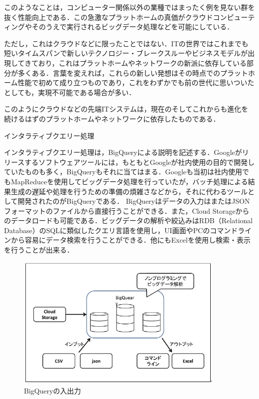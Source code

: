 このようなことは，コンピューター関係以外の業種ではまったく例を見ない群を抜く性能向上である．この急激なプラットホームの真価がクラウドコンピューティングやそのうえで実行されるビッグデータ処理などを可能にしている．\cite{bigquerystart}

ただし，これはクラウドなどに限ったことではない．ITの世界ではこれまでも短いタイムスパンで新しいテクノロジー・ブレークスルーやビジネスモデルが出現してきており，これはプラットホームやネットワークの新派に依存している部分が多くある．言葉を変えれば，これらの新しい発想はその時点でのプラットホーム性能で初めて成り立つものであり，これをわずかでも前の世代に思いついたとしても，実現不可能である場合が多い．

このようにクラウドなどの先端ITシステムは，現在のそしてこれからも進化を続けるはずのプラットホームやネットワークに依存したものである．\cite{bigquerystart}


インタラティブクエリー処理

インタラティブクエリー処理は，BigQueryによる説明を記述する．Googleがリリースするソフトウェアツールには，もともとGoogleが社内使用の目的で開発していたものも多く，BigQueryもそれに当てはまる．Googleも当初は社内使用でもMapReduceを使用してビッグデータ処理を行っていたが，バッチ処理による結果生成の遅延や処理を行うための準備の煩雑さなどから，それに代わるツールとして開発されたのがBigQueryである．
BigQueryはデータの入力はまたはJSONフォーマットのファイルから直接行うことができる．また，Cloud Storageからのデータロードも可能である．ビッグデータの解析や絞込みはRDB（Relational Database）のSQLに類似したクエリ言語を使用し，UI画面やPCのコマンドラインから容易にデータ検索を行うことができる．他にもExcelを使用し検索・表示を行うことが出来る．\cite{bigquerystart}


\begin{figure}[H]
\centering
\includegraphics[width=10cm]{bigqueryinout.png}
\caption{BigQueryの入出力}\label{サンプル図}
\end{figure}



